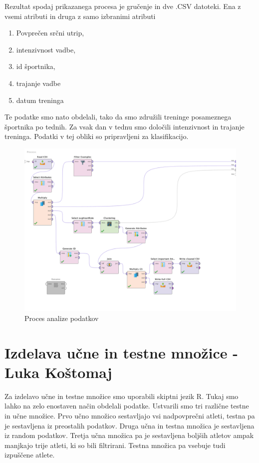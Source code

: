 \documentclass[a4paper,11pt]{article}
\begin{document}
Rezultat spodaj prikazanega procesa je gručenje in dve .CSV datoteki. Ena z vsemi atributi in druga z samo izbranimi atributi
\begin{enumerate}
\item{Povprečen srčni utrip,}
\item{intenzivnost vadbe,}
\item{id športnika,}
\item{trajanje vadbe}
\item{datum treninga}
\end{enumerate} 

Te podatke smo nato obdelali, tako da smo združili treninge posameznega športnika po tednih. Za vsak dan v tednu smo določili intenzivnost in trajanje treninga. Podatki v tej obliki so pripravljeni za klasifikacijo.

\begin{figure}[H]
\caption{Proces analize podatkov}
\centering
\includegraphics[width=1\textwidth]{IntensityClusteringProcess}
\end{figure}


\newpage
\section{Izdelava učne in testne množice - Luka Koštomaj}
Za izdelavo učne in testne množice smo uporabili skiptni jezik R.
Tukaj smo lahko na zelo enostaven način obdelali podatke.
Ustvarili smo tri različne testne in učne množice.
Prvo učno množico sestavljajo vsi nadpovprečni atleti, testna pa je sestavljena iz preostalih podatkov.
Druga učna in testna množica je sestavljena iz random podatkov.
Tretja učna množica pa je sestavljena boljših atletov ampak manjkajo trije atleti, ki so bili filtrirani. 
Testna množica pa vsebuje tudi izpuščene atlete.
\end{document}
